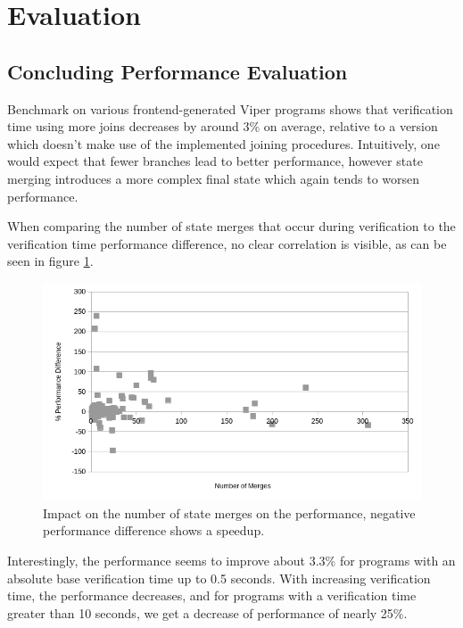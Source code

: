 \documentclass[11pt]{article}
\begin{document}
    \newpage
    \section{Evaluation}

    \subsection{Concluding Performance Evaluation}
    
    Benchmark on various frontend-generated Viper programs shows that verification time using more joins
    decreases by around 3\% on average, relative to a version which doesn't make use of the implemented joining procedures.
    Intuitively, one would expect that fewer branches lead to better
    performance, however state merging introduces a more complex final state which again tends to worsen
    performance.
    
    When comparing the number of state merges that occur during verification
    to the verification time performance difference, no clear correlation is
    visible, as can be seen in figure \ref{fig:state-merges}.

    \begin{figure}[H]
        \includegraphics[width=\linewidth]{state-merges-vs-performance.png}
        \caption{
            Impact on the number of state merges on the performance,
            negative performance difference shows a speedup.
        }
        \label{fig:state-merges}
    \end{figure}

    Interestingly, the performance seems to improve about 3.3\% for programs
    with an absolute base verification time up to 0.5 seconds. With increasing verification
    time, the performance decreases, and for programs with a verification time greater
    than 10 seconds, we get a decrease of performance of nearly 25\%.
    
\end{document}
